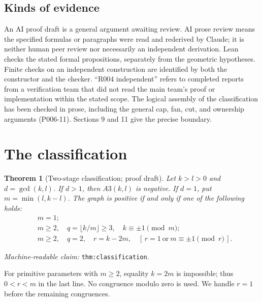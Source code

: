 \documentclass[11pt]{amsart}
\newcommand{\record}[1]{\nolinkurl{#1}}
\newtheorem{theorem}{Theorem}
\newcommand{\claimid}[1]{\par\nopagebreak\noindent\textit{Machine-readable claim:} \record{#1}.\par}
\begin{document}
\subsection{Kinds of evidence}
An AI proof draft is a general argument awaiting review. AI prose review
means the specified formulas or paragraphs were read and rederived by
Claude; it is neither human peer review nor necessarily an independent
derivation. Lean checks the stated formal propositions, separately from
the geometric hypotheses. Finite checks on an independent construction
are identified by both the constructor and the checker. ``R004
independent'' refers to completed reports from a verification team that
did not read the main team's proof or implementation within the stated
scope. The logical assembly of the classification has been checked in
prose, including the general cap, fan, cut, and ownership arguments
(P006-11). Sections 9 and 11 give the precise boundary.

\section{The classification}\label{sec:classification}
\begin{theorem}[Two-stage classification; proof draft]\label{thm:classification}
Let $k>l>0$ and $d=\gcd(k,l)$. If $d>1$, then $A3(k,l)$ is negative.
If $d=1$, put $m=\min(l,k-l)$. The graph is positive if and only if
one of the following holds:
\begin{equation}\label{eq:2}
\begin{aligned}
 &m=1;\\
 &m\ge2,\quad q=\lfloor k/m\rfloor\ge3,\quad k\equiv\pm1\pmod m;\\
 &m\ge2,\quad q=2,\quad r=k-2m,\quad
       [\,r=1\ \text{or}\ m\equiv\pm1\pmod r\,].
\end{aligned}\tag{2}
\end{equation}
\end{theorem}
\claimid{thm:classification}
For primitive parameters with $m\ge2$, equality $k=2m$ is impossible;
thus $0<r<m$ in the last line. No congruence modulo zero is used.
We handle $r=1$ before the remaining congruences.
\end{document}
